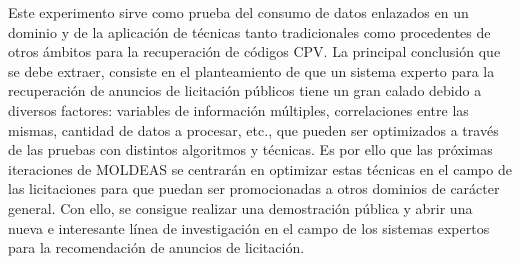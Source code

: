 \begin{itemize}
Este experimento sirve como prueba del consumo de datos enlazados en un dominio y de la aplicación de técnicas 
tanto tradicionales como procedentes de otros ámbitos para la recuperación de códigos \gls{CPV}. La principal conclusión 
que se debe extraer, consiste en el planteamiento de que un sistema experto para la recuperación de anuncios de licitación 
públicos tiene un gran calado debido a diversos factores: variables de información múltiples, correlaciones entre las 
mismas, cantidad de datos a procesar, etc., que pueden ser optimizados a través de las pruebas con distintos algoritmos 
y técnicas. Es por ello que las próximas iteraciones de MOLDEAS se centrarán en optimizar estas técnicas en el campo 
de las licitaciones para que puedan ser promocionadas a otros dominios de carácter general. Con ello, se consigue 
realizar una demostración pública y abrir una nueva e interesante línea de investigación en el campo de los sistemas 
expertos para la recomendación de anuncios de licitación.

\end{itemize}

\cleardoublepage